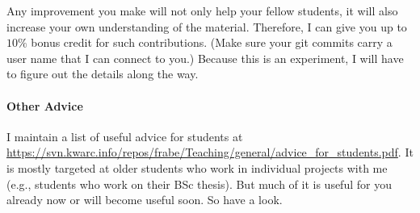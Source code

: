 Any improvement you make will not only help your fellow students, it will also increase your own understanding of the material.
Therefore, I can give you up to $10\%$ bonus credit for such contributions.
(Make sure your git commits carry a user name that I can connect to you.)
Because this is an experiment, I will have to figure out the details along the way.

\paragraph{Other Advice}
I maintain a list of useful advice for students at \url{https://svn.kwarc.info/repos/frabe/Teaching/general/advice_for_students.pdf}.
It is mostly targeted at older students who work in individual projects with me (e.g., students who work on their BSc thesis).
But much of it is useful for you already now or will become useful soon.
So have a look.